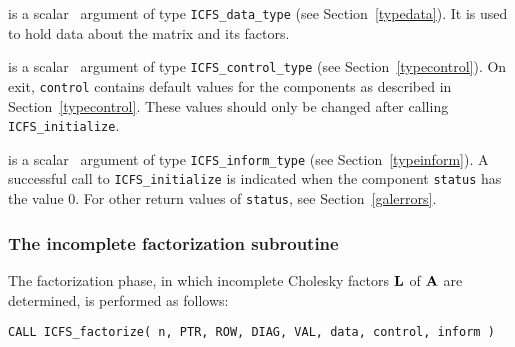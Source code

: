 \documentclass{galahad}
\newcommand{\packagename}{ICFS}
\begin{document}
\vspace*{-3mm}
\begin{description}

 is a scalar \intentinout\ argument of type
{\tt \packagename\_data\_type}
(see Section~\ref{typedata}). It is used to hold data about the
matrix and its factors.

 is a scalar \intentout\ argument of type
{\tt \packagename\_control\_type}
(see Section~\ref{typecontrol}).
On exit, {\tt control} contains default values for the components as
described in Section~\ref{typecontrol}.
These values should only be changed after calling
{\tt \packagename\_initialize}.

 is a scalar \intentout\ argument of type
{\tt \packagename\_inform\_type}
(see Section~\ref{typeinform}). A successful call to
{\tt \packagename\_initialize}
is indicated when the  component {\tt status} has the value 0.
For other return values of {\tt status}, see Section~\ref{galerrors}.

\end{description}


\subsubsection{The incomplete factorization subroutine}
The factorization phase, in which incomplete Cholesky factors ${\mathbf{L}}$ of
${\mathbf{A}}$ are determined, is performed as follows:

\vspace*{1mm}

\hspace{8mm}
{\tt CALL \packagename\_factorize( n, PTR, ROW, DIAG, VAL, data, control, inform )}
\end{document}
